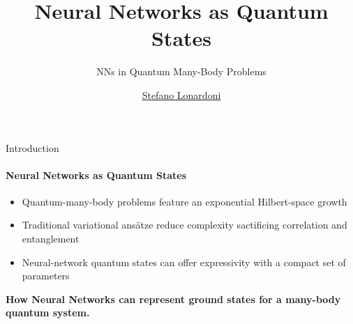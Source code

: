 \documentclass{beamer}
\title{Neural Networks as Quantum States}
\subtitle{NNs in Quantum Many-Body Problems}
\author{\href{mailto:stefano.lonardoni1@studenti.unimi.it}{Stefano Lonardoni}}
\begin{document}
\maketitle

\begin{frame}{Introduction}
\framesubtitle{Neural Networks as Quantum States}
\begin{itemize}
	\item Quantum-many-body problems feature an exponential Hilbert-space growth
	\item Traditional variational ansätze reduce complexity sactificing correlation and entanglement
	\item Neural-network quantum states can offer expressivity with a compact set of parameters
\end{itemize}

\textbf{How Neural Networks can represent ground states for a many-body quantum system.}

\end{frame}
\end{document}
